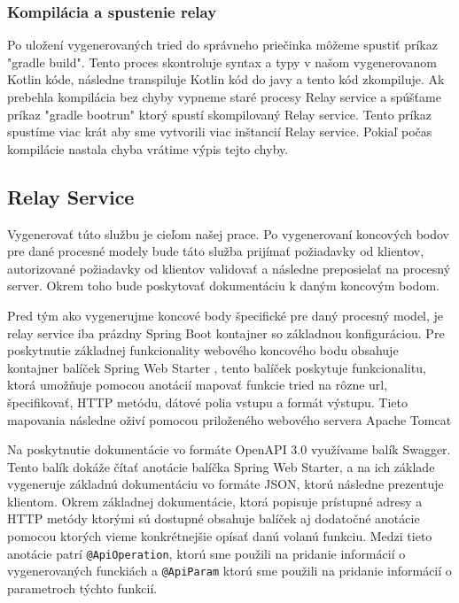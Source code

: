 \subsubsection{Kompilácia a spustenie relay}

Po uložení vygenerovaných tried do správneho priečinka môžeme spustiť príkaz "gradle build". Tento proces skontroluje syntax a typy v našom vygenerovanom Kotlin kóde, následne transpiluje Kotlin kód do javy a tento kód zkompiluje. Ak prebehla kompilácia bez chyby vypneme staré procesy Relay service a spúšťame príkaz "gradle bootrun" ktorý spustí skompilovaný Relay service. Tento príkaz spustíme viac krát aby sme vytvorili viac inštancií Relay service. Pokiaľ počas kompilácie nastala chyba vrátime výpis tejto chyby.

\subsection{Relay Service}

Vygenerovať túto službu je cieľom našej prace. Po vygenerovaní koncových bodov pre dané procesné modely bude táto služba prijímať požiadavky od klientov, autorizované požiadavky od klientov validovať a následne preposielať na procesný server. Okrem toho bude poskytovať dokumentáciu k daným koncovým bodom.

Pred tým ako vygenerujme koncové body špecifické pre daný procesný model, je relay service iba prázdny Spring Boot kontajner so základnou konfiguráciou. Pre poskytnutie základnej funkcionality webového koncového bodu obsahuje kontajner balíček Spring Web Starter \cite{webstarter}, tento balíček poskytuje funkcionalitu, ktorá umožňuje pomocou anotácií mapovať funkcie tried na rôzne \acrshort{url}, špecifikovať, HTTP metódu, dátové polia vstupu a formát výstupu. Tieto mapovania následne oživí pomocou priloženého webového servera Apache Tomcat \cite{tomcat}


Na poskytnutie dokumentácie vo formáte OpenAPI 3.0 \cite{openapi} využívame balík Swagger. Tento balík dokáže čítať anotácie balíčka Spring Web Starter, a na ich základe vygeneruje základnú dokumentáciu vo formáte JSON, ktorú následne prezentuje klientom. Okrem základnej dokumentácie, ktorá popisuje prístupné adresy a HTTP metódy ktorými sú dostupné obsahuje balíček aj dodatočné anotácie pomocou ktorých vieme konkrétnejšie opísať danú volanú funkciu. Medzi tieto anotácie patrí \texttt{@ApiOperation}, ktorú sme použili na pridanie informácií o vygenerovaných funckiách a \texttt{@ApiParam} ktorú sme použili na pridanie informácií o parametroch týchto funkcií.

